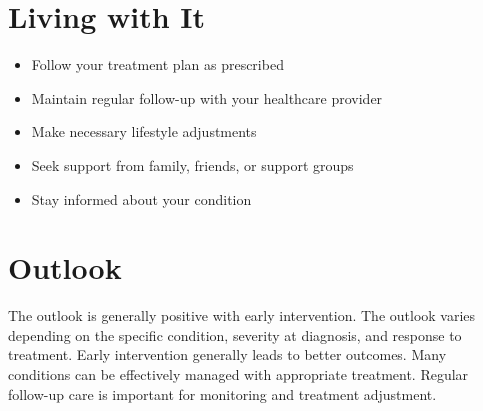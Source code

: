 \section{Living with It}
\begin{itemize}[noitemsep]
  \item Follow your treatment plan as prescribed
  \item Maintain regular follow-up with your healthcare provider
  \item Make necessary lifestyle adjustments
  \item Seek support from family, friends, or support groups
  \item Stay informed about your condition
\end{itemize}
\section{Outlook}
The outlook is generally positive with early intervention. The outlook varies depending on the specific condition, severity at diagnosis, and response to treatment. Early intervention generally leads to better outcomes. Many conditions can be effectively managed with appropriate treatment. Regular follow-up care is important for monitoring and treatment adjustment.
